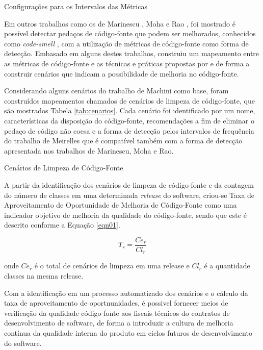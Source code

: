 	\begin{table}[!ht]
	\caption{Configurações para os Intervalos das Métricas}
	\addtolength{\belowcaptionskip}{2pt}
	\begin{center}
		
	\label{tab:good-metrics}
	\end{center}
	\end{table}
	\FloatBarrier

Em outros trabalhos como os de Marinescu  \cite{marinescu2005measurement}, Moha \cite{moha2010decor} e Rao \cite{rao2007detecting}, foi mostrado é possível detectar pedaços de código-fonte que podem ser melhorados, conhecidos como \textit{code-smell} \cite{fowler1999refactoring}, com a utilização de métricas de código-fonte como forma de detecção. Embasado em alguns destes trabalhos, \cite{Machini2010} construiu um mapeamento entre as métricas de código-fonte e as técnicas e práticas propostas por \cite{Martin2008} e \cite{beck2007implementation} de forma a construir cenários que indicam a possibilidade de melhoria no código-fonte.

Considerando alguns cenários do trabalho de Machini \cite{Machini2010} como base, foram construídos mapeamentos chamados de cenários de limpeza de código-fonte, que são mostrados Tabela \ref{tab:cenarios}. Cada cenário foi identificado por um nome, características da disposição do código-fonte, recomendações a fim de eliminar o pedaço de código não coesa e a forma de detecção pelos intervalos de frequência do trabalho de Meirelles \cite{Meirelles2013} que é compatível também com a forma de detecção apresentada nos trabalhos de Marinescu, Moha e Rao.
	
	\begin{table}[H]
	\centering
	\caption{Cenários de Limpeza de Código-Fonte}
	\addtolength{\belowcaptionskip}{6pt}
		
	\label{tab:cenarios}
	\end{table}
	\FloatBarrier

A partir da identificação dos cenários de limpeza de código-fonte e da contagem do número de classes em uma determinada \textit{release} do software, criou-se Taxa de Aproveitamento de Oportunidade de Melhoria de Código-Fonte como uma indicador objetivo de melhoria da qualidade do código-fonte, sendo que este é descrito conforme a Equação \ref{eqn01}.

\begin{equation}
\label{eqn01}
T_r =   \frac{{{Ce_r}}}{{Cl_r}}
\end{equation}

onde $ Ce_r $ é o total de cenários de limpeza em uma release e $ Cl_r $ é a quantidade classes na mesma release.

Com a identificação em um processo automatizado dos cenários e o cálculo da taxa de aproveitamento de oportnunidades, é possivel fornecer meios de verificação da qualidade código-fonte aos fiscais técnicos do contratos de desenvolvimento de software, de forma a introduzir a cultura de melhoria contínua da qualidade interna do produto em ciclos futuros de desenvolvimento do software. 


